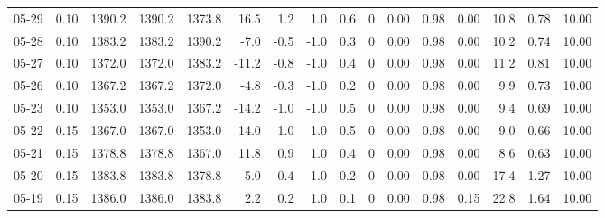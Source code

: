 \begin{threeparttable}
{\begin{tabular}{lrrrrrrrrrrrrrrr}
  05-29 &     0.10 & 1390.2 & 1390.2 & 1373.8 &       16.5 &            1.2 &                      1.0 &                 0.6 &              0 &       0.00 &      0.98 &           0.00 &             10.8 &            0.78 &                  10.00 \\
  05-28 &     0.10 & 1383.2 & 1383.2 & 1390.2 &       -7.0 &           -0.5 &                     -1.0 &                 0.3 &              0 &       0.00 &      0.98 &           0.00 &             10.2 &            0.74 &                  10.00 \\
  05-27 &     0.10 & 1372.0 & 1372.0 & 1383.2 &      -11.2 &           -0.8 &                     -1.0 &                 0.4 &              0 &       0.00 &      0.98 &           0.00 &             11.2 &            0.81 &                  10.00 \\
  05-26 &     0.10 & 1367.2 & 1367.2 & 1372.0 &       -4.8 &           -0.3 &                     -1.0 &                 0.2 &              0 &       0.00 &      0.98 &           0.00 &              9.9 &            0.73 &                  10.00 \\
  05-23 &     0.10 & 1353.0 & 1353.0 & 1367.2 &      -14.2 &           -1.0 &                     -1.0 &                 0.5 &              0 &       0.00 &      0.98 &           0.00 &              9.4 &            0.69 &                  10.00 \\
  05-22 &     0.15 & 1367.0 & 1367.0 & 1353.0 &       14.0 &            1.0 &                      1.0 &                 0.5 &              0 &       0.00 &      0.98 &           0.00 &              9.0 &            0.66 &                  10.00 \\
  05-21 &     0.15 & 1378.8 & 1378.8 & 1367.0 &       11.8 &            0.9 &                      1.0 &                 0.4 &              0 &       0.00 &      0.98 &           0.00 &              8.6 &            0.63 &                  10.00 \\
  05-20 &     0.15 & 1383.8 & 1383.8 & 1378.8 &        5.0 &            0.4 &                      1.0 &                 0.2 &              0 &       0.00 &      0.98 &           0.00 &             17.4 &            1.27 &                  10.00 \\
  05-19 &     0.15 & 1386.0 & 1386.0 & 1383.8 &        2.2 &            0.2 &                      1.0 &                 0.1 &              0 &       0.00 &      0.98 &           0.15 &             22.8 &            1.64 &                  10.00 \\

\end{tabular}}
\end{threeparttable}
